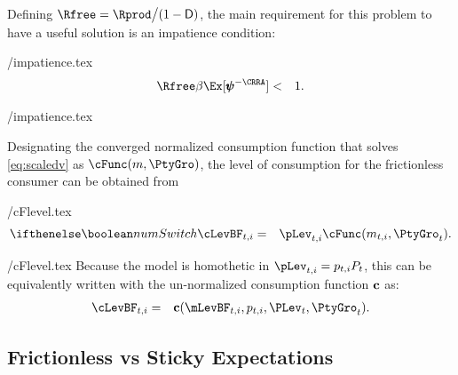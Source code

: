 Defining $\Rfree = \Rprod\big/\PLives$, the main requirement for this problem to have a useful solution is an impatience condition: %

\begin{verbatimwrite}{\eq/impatience.tex}
  \begin{eqnarray*}
    \label{eq:impatience}
    \Rfree \beta  \Ex[ \pmb{\psi}^{-\CRRA}]  & < & 1.
  \end{eqnarray*}
\end{verbatimwrite}
 \eq/impatience.tex

Designating the converged normalized consumption function that solves \eqref{eq:scaledv} as
$\cFunc(m,\PtyGro)$, the level of consumption for the frictionless consumer can be obtained %
from
\begin{verbatimwrite}{\eq/cFlevel.tex}
  \begin{eqnarray}
    \label{eq:cFlevel}
    \ifnumSw  \cLevBF_{t,i} & = & \pLev_{t,i} \cFunc(m_{t,i},\PtyGro_t)  \nonumber
                                  .
  \end{eqnarray}
\end{verbatimwrite}
 {\eq/cFlevel.tex}
Because the model is homothetic in $\pLev_{t,i}={p}_{t,i} {P}_{t}$, this can be equivalently written with the un-normalized consumption function $\textbf{c}$ as:
\begin{eqnarray*}
  \cLevBF_{t,i} & = & \cFuncLev(\mLevBF_{t,i}, p_{t,i}, {\PLev}_t, {\PtyGro}_t).
\end{eqnarray*}


\subsection{Frictionless vs Sticky Expectations}\label{sec:StickySOE}

